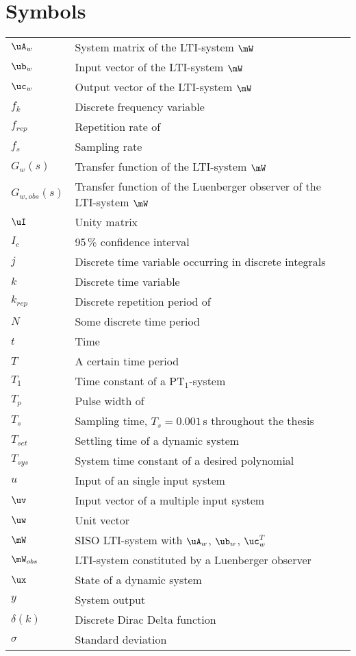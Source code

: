 \section*{Symbols}

\begin{longtable}[l]{ll}
$\uA_w$										& System matrix of the LTI-system $\mW$\\
$\ub_w$										& Input vector of the LTI-system $\mW$\\
$\uc_w$										& Output vector of the LTI-system $\mW$\\
$f_k$											& Discrete frequency variable\\
$f_{rep}$								  & Repetition rate of \rpms\\
$f_s$										  & Sampling rate\\
$G_w(s)$									& Transfer function of the LTI-system $\mW$\\
$G_{w,obs}(s)$						& Transfer function of the Luenberger observer of the LTI-system $\mW$\\
$\uI$											& Unity matrix\\
$I_c$										  & 95\,\% confidence interval\\
$j$					    					& Discrete time variable occurring in discrete integrals\\
$k$												& Discrete time variable\\
$k_{rep}$								  & Discrete repetition period of \rpms\\
$N$   										& Some discrete time period\\
$t$   										& Time\\
$T$   										& A certain time period\\
$T_1$											& Time constant of a PT$_1$-system\\
$T_p$										  & Pulse width of \rpms\\
$T_s$       							& Sampling time, $T_s=0.001\,$s throughout the thesis\\
$T_{set}$									& Settling time of a dynamic system\\
$T_{sys}$									& System time constant of a desired polynomial\\
$u$         							& Input of an single input system\\
$\uv$       							& Input vector of a multiple input system\\
$\uw$											& Unit vector\\
$\mW$											& SISO LTI-system with $\uA_w$, $\ub_w$, $\uc^T_w$\\
$\mW_{obs}$								& LTI-system constituted by a Luenberger observer\\
$\ux$      		  					& State of a dynamic system\\
$y$         							& System output\\
$\delta(k)$							  & Discrete Dirac Delta function\\
$\sigma$								  & Standard deviation\\
\end{longtable}

